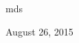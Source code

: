 \documentclass[a4paper,journal]{IEEEtran}
\begin{document}
\hfill mds

\hfill August 26, 2015


%
%



%
%
\end{document}
